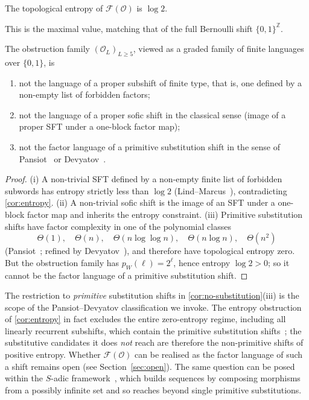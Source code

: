 \documentclass[11pt,reqno]{amsart}
\newcommand{\Z}{\mathbb{Z}}
\newcommand{\Obs}{\mathcal{O}}
\newcommand{\Fac}{\mathcal{F}}
\begin{document}
\begin{corollary}\label{cor:entropy}
The topological entropy of $\Fac(\Obs)$ is $\log 2$.
\end{corollary}

This is the maximal value, matching that of the full Bernoulli shift
$\{0,1\}^\Z$.

\begin{corollary}
\label{cor:no-substitution}
The obstruction family $(\Obs_L)_{L \ge 5}$, viewed as a graded family of
finite languages over $\{0,1\}$, is
\begin{enumerate}[label=(\roman*)]
\item not the language of a proper subshift of finite type, that is, one
  defined by a non-empty list of forbidden factors;
\item not the language of a proper sofic shift in the classical sense
  (image of a proper SFT under a one-block factor map);
\item not the factor language of a primitive substitution shift in the
  sense of Pansiot~\cite{Pansiot1984} or Devyatov~\cite{Devyatov2015}.
\end{enumerate}
\end{corollary}

\begin{proof}
(i) A non-trivial SFT defined by a non-empty finite list of forbidden subwords
has entropy strictly less than $\log 2$ (Lind--Marcus~\cite{LindMarcus1995}),
contradicting \cref{cor:entropy}. (ii) A non-trivial sofic shift is the image of an
SFT under a one-block factor map and inherits the entropy constraint.
(iii) Primitive substitution shifts have factor complexity in one of the
polynomial classes
\[
\Theta(1),\quad \Theta(n),\quad \Theta(n \log \log n),\quad \Theta(n \log n),\quad \Theta(n^2)
\]
(Pansiot~\cite{Pansiot1984}; refined by Devyatov~\cite{Devyatov2015}), and
therefore have topological entropy zero. But the obstruction family has
$p_W(\ell) = 2^\ell$, hence entropy $\log 2 > 0$; so it cannot be the factor
language of a primitive substitution shift. \qedhere
\end{proof}

\begin{remark}\label{rem:non-primitive}
The restriction to \emph{primitive} substitution shifts in
\cref{cor:no-substitution}(iii) is the scope of the
Pansiot--Devyatov classification we invoke. The entropy obstruction of
\cref{cor:entropy} in fact excludes the entire zero-entropy
regime, including all linearly recurrent subshifts, which contain the
primitive substitution shifts~\cite{DurandHostSkau1999}; the substitutive
candidates it does \emph{not} reach are therefore the non-primitive shifts
of positive entropy. Whether $\Fac(\Obs)$ can be realised as the factor
language of such a shift remains open (see Section~\ref{sec:open}). The same
question can be posed within the $S$-adic
framework~\cite{BertheDelecroix2014}, which builds sequences by composing
morphisms from a possibly infinite set and so reaches beyond single
primitive substitutions.
\end{remark}
\end{document}
